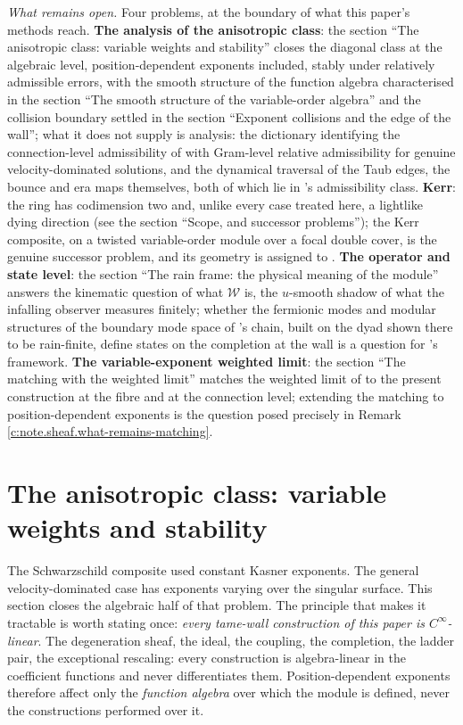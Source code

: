 \documentclass[11pt]{article}
\theoremstyle{definition}
\theoremstyle{plain}
\providecommand{\shW}{}\renewcommand{\shW}{\mathcal{W}}
\begin{document}
\emph{What remains open.} Four problems, at the boundary of what this paper's methods reach. \textbf{The analysis of the anisotropic class}: the section ``The anisotropic class: variable weights and stability'' closes the diagonal class at the algebraic level, position-dependent exponents included, stably under relatively admissible errors, with the smooth structure of the function algebra characterised in the section ``The smooth structure of the variable-order algebra'' and the collision boundary settled in the section ``Exponent collisions and the edge of the wall''; what it does not supply is analysis: the dictionary identifying the connection-level admissibility of \cite{ButlerT6} with Gram-level relative admissibility for genuine velocity-dominated solutions, and the dynamical traversal of the Taub edges, the bounce and era maps themselves, both of which lie in \cite{ButlerT6}'s admissibility class. \textbf{Kerr}: the ring has codimension two and, unlike every case treated here, a lightlike dying direction (see the section ``Scope, and successor problems''); the Kerr composite, on a twisted variable-order module over a focal double cover, is the genuine successor problem, and its geometry is assigned to \cite{ButlerT6}. \textbf{The operator and state level}: the section ``The rain frame: the physical meaning of the module'' answers the kinematic question of what $\shW$ is, the $u$-smooth shadow of what the infalling observer measures finitely; whether the fermionic modes and modular structures of the boundary mode space of \cite{ButlerT5}'s chain, built on the dyad shown there to be rain-finite, define states on the completion at the wall is a question for \cite{ButlerT5}'s framework. \textbf{The variable-exponent weighted limit}: the section ``The matching with the weighted limit'' matches the weighted limit of \cite{ButlerT6} to the present construction at the fibre and at the connection level; extending the matching to position-dependent exponents is the question posed precisely in Remark \ref{c:note.sheaf.what-remains-matching}.

\section{The anisotropic class: variable weights and stability}

\label{c:note.sheaf.setting-anisotropic-class-variable-weights-stability}
The Schwarzschild composite used constant Kasner exponents. The general velocity-dominated case has exponents varying over the singular surface. This section closes the algebraic half of that problem. The principle that makes it tractable is worth stating once: \emph{every tame-wall construction of this paper is $C^\infty$-linear}. The degeneration sheaf, the ideal, the coupling, the completion, the ladder pair, the exceptional rescaling: every construction is algebra-linear in the coefficient functions and never differentiates them. Position-dependent exponents therefore affect only the \emph{function algebra} over which the module is defined, never the constructions performed over it.
\end{document}
